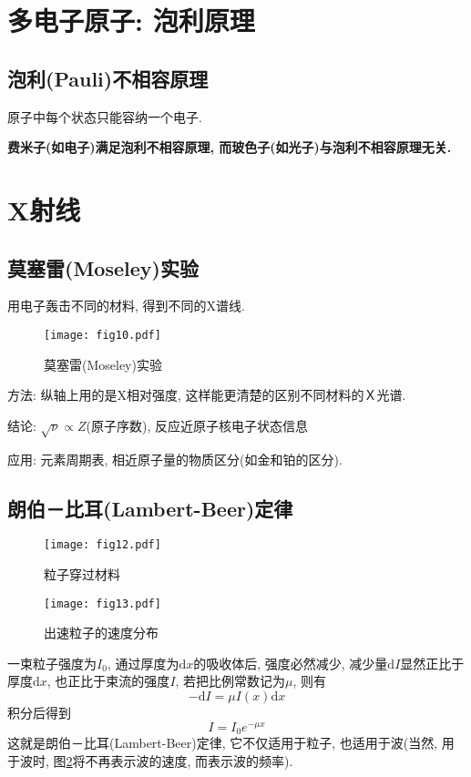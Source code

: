 \section{多电子原子: 泡利原理}
\subsection{泡利(Pauli)不相容原理}
原子中每个状态只能容纳一个电子. 

\textbf{费米子(如电子)满足泡利不相容原理, 而玻色子(如光子)与泡利不相容原理无关. }

\section{X射线}
\subsection{莫塞雷(Moseley)实验}
用电子轰击不同的材料, 得到不同的X谱线. 
\begin{figure}[!htb]
\centering
\texttt{[image: fig10.pdf]}
\caption{\label{fig10}莫塞雷(Moseley)实验}
\end{figure}

方法: 纵轴上用的是X相对强度, 这样能更清楚的区别不同材料的Ｘ光谱. 

结论: $\sqrt{\nu}\varpropto Z$(原子序数), 反应近原子核电子状态信息

应用: 元素周期表, 相近原子量的物质区分(如金和铂的区分). 

\subsection{朗伯－比耳(Lambert-Beer)定律}
\begin{figure}[!htb]
\begin{minipage}[b]{0.48\textwidth}
\centering
\texttt{[image: fig12.pdf]}
\caption{\label{fig12}粒子穿过材料}
\end{minipage}%
\begin{minipage}[b]{0.48\textwidth}
\centering
\texttt{[image: fig13.pdf]}
\caption{\label{fig13}出速粒子的速度分布}
\end{minipage}
\end{figure}
一束粒子强度为$I_0$, 通过厚度为$\textrm{d}x$的吸收体后, 强度必然减少, 减少量$\textrm{d}I$显然正比于厚度$\textrm{d}x$, 也正比于束流的强度$I$, 若把比例常数记为$\mu$, 则有
\[
-\textrm{d}I=\mu I(x)\textrm{d}x
\]
积分后得到
\[
I=I_0e^{-\mu x}
\]
这就是朗伯－比耳(Lambert-Beer)定律, 它不仅适用于粒子, 也适用于波(当然, 用于波时, 图\ref{fig13}将不再表示波的速度, 而表示波的频率). 

